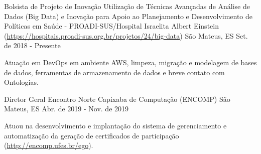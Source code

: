 

\begin{cventries}

  \cventry
    {Bolsista de Projeto de Inovação} %
    {Utilização de Técnicas Avançadas de Análise de Dados (Big Data) e Inovação para Apoio ao Planejamento e Desenvolvimento de Políticas em Saúde - PROADI-SUS/Hospital Israelita Albert Einstein (\url{https://hospitais.proadi-sus.org.br/projetos/24/big-data})} %
    {São Mateus, ES} %
    {Set. de 2018 - Presente} %
    {
      \begin{cvitems} %
        \item {Atuação em DevOps em ambiente AWS, limpeza, migração e modelagem de bases de dados, ferramentas de armazenamento de dados e breve contato com Ontologias.}
      \end{cvitems}
    }

  \cventry
    {Diretor Geral} %
    {Encontro Norte Capixaba de Computação (ENCOMP)} %
    {São Mateus, ES} %
    {Abr. de 2019 - Nov. de 2019} %
    {
      \begin{cvitems} %
        \item {Atuou na desenvolvimento e implantação do sistema de gerenciamento e automatização da geração de certificados de participação (\url{http://encomp.ufes.br/ego}). }
      \end{cvitems}
    }
	


\end{cventries}
